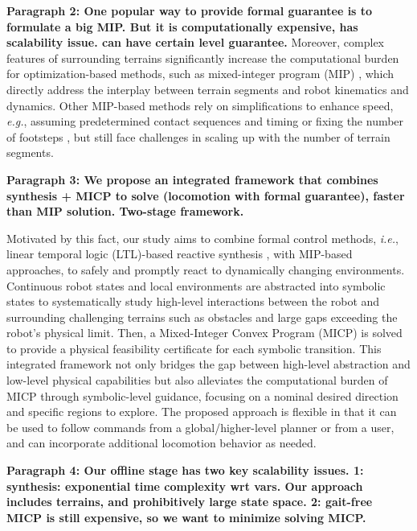 \documentclass[letterpaper, 10 pt, conference]{ieeeconf}
\begin{document}
\textbf{Paragraph 2: One popular way to provide formal guarantee is to formulate a big MIP. 
But it is computationally expensive, has scalability issue.
can have certain level guarantee.}
Moreover, complex features of surrounding terrains significantly increase the computational burden for optimization-based methods, such as mixed-integer program (MIP) \cite{valenzuela2016mixed,shirai2022simultaneous,jiang2023locomotion}, which directly address the interplay between terrain segments and robot kinematics and dynamics. Other MIP-based methods rely on simplifications to enhance speed, \textit{e.g.}, assuming predetermined contact sequences and timing \cite{deits2014footstep,ponton2016convex,ding2020kinodynamic,tonneau2020sl1m,risbourg2022real,acosta2023bipedal} or fixing the number of footsteps \cite{aceituno2017simultaneous}, but still face challenges in scaling up with the number of terrain segments.

\textbf{Paragraph 3: We propose an integrated framework that combines synthesis + MICP to solve (locomotion with formal guarantee), faster than MIP solution. Two-stage framework.}

Motivated by this fact, our study aims to combine formal control methods, \textit{i.e.}, linear temporal logic (LTL)-based reactive synthesis \cite{bloem2012synthesis}, with MIP-based approaches, to safely and promptly react to dynamically changing environments. Continuous robot states and local environments are abstracted into symbolic states to systematically study high-level interactions between the robot and surrounding challenging terrains such as obstacles and large gaps exceeding the robot's physical limit. Then, a Mixed-Integer Convex Program (MICP) is solved to provide a physical feasibility certificate for each symbolic transition. This integrated framework not only bridges the gap between high-level abstraction and low-level physical capabilities but also alleviates the computational burden of MICP through symbolic-level guidance, focusing on a nominal desired direction and specific regions to explore.
The proposed approach is flexible in that it can be used to follow commands from a global/higher-level planner \cite{wermelinger2016navigation, fernbach2017kinodynamic,norby2020fast,chignoli2022rapid,liao2023walking,feng2023gpf} or from a user, and can incorporate additional locomotion behavior as needed.

\textbf{Paragraph 4: Our offline stage has two key scalability issues. 1: synthesis: exponential time complexity wrt vars. Our approach includes terrains, and prohibitively large state space. 2: gait-free MICP is still expensive, so we want to minimize solving MICP.}
\end{document}

